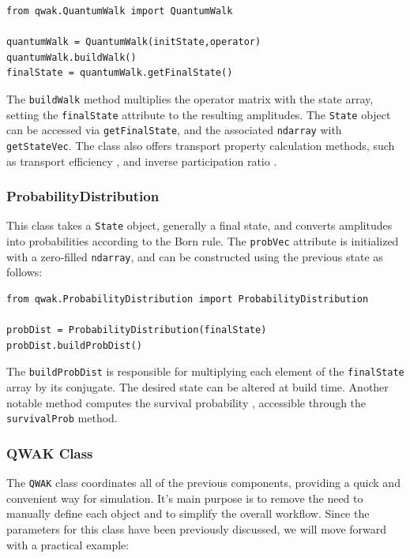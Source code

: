 \documentclass[main.tex]{subfiles}
\begin{document}
\begin{lstlisting}[style=code,escapeinside={__}]
from qwak.QuantumWalk import QuantumWalk 

quantumWalk = QuantumWalk(initState,operator)
quantumWalk.buildWalk()
finalState = quantumWalk.getFinalState()
\end{lstlisting}

The \texttt{buildWalk} method multiplies the operator matrix with the state
array, setting the \texttt{finalState} attribute to the resulting amplitudes.
The \texttt{State} object can be accessed via \texttt{getFinalState}, and the
associated \texttt{ndarray} with \texttt{getStateVec}. The class also offers
transport property calculation methods, such as transport efficiency
\cite{razzoli21}, and inverse participation ratio \cite{buarqueAperiodic19}.

\subsubsection{ProbabilityDistribution}
This class takes a \texttt{State} object, generally a final state, and converts
amplitudes into probabilities according to the Born rule. The \texttt{probVec}
attribute is initialized with a zero-filled \texttt{ndarray}, and can be
constructed using the previous state as follows:

\begin{lstlisting}[style=code,escapeinside={__}]
from qwak.ProbabilityDistribution import ProbabilityDistribution

probDist = ProbabilityDistribution(finalState)
probDist.buildProbDist()
\end{lstlisting}

The \texttt{buildProbDist} is responsible for multiplying each element of the
\texttt{finalState} array by its conjugate. The desired state can be altered at
build time. Another notable method computes the survival probability
\cite{buarqueAperiodic19}, accessible through the \texttt{survivalProb} method.

\subsubsection{QWAK Class}

The \texttt{QWAK} class coordinates all of the previous components, providing a
quick and convenient way for simulation.  It's main purpose is to remove the
need to manually define each object and to simplify the overall workflow. Since
the parameters for this class have been previously discussed, we will move
forward with a practical example:
\end{document}
